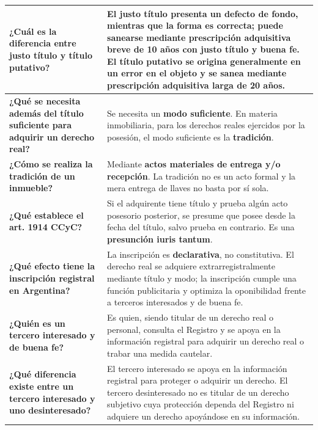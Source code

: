\documentclass[12pt,oneside]{book}
\begin{document}
\begin{longtable}{|>{\raggedright\arraybackslash}p{}|>{\raggedright\arraybackslash}p{}|}
\textbf{¿Cuál es la diferencia entre justo título y título putativo?} &
El \textbf{justo título} presenta un defecto de fondo, mientras que la forma es correcta; puede sanearse mediante prescripción adquisitiva breve de 10 años con justo título y buena fe. El \textbf{título putativo} se origina generalmente en un error en el objeto y se sanea mediante prescripción adquisitiva larga de 20 años. \\
\hline

\textbf{¿Qué se necesita además del título suficiente para adquirir un derecho real?} &
Se necesita un \textbf{modo suficiente}. En materia inmobiliaria, para los derechos reales ejercidos por la posesión, el modo suficiente es la \textbf{tradición}. \\
\hline

\textbf{¿Cómo se realiza la tradición de un inmueble?} &
Mediante \textbf{actos materiales de entrega y/o recepción}. La tradición no es un acto formal y la mera entrega de llaves no basta por sí sola. \\
\hline

\textbf{¿Qué establece el art. 1914 CCyC?} &
Si el adquirente tiene título y prueba algún acto posesorio posterior, se presume que posee desde la fecha del título, salvo prueba en contrario. Es una \textbf{presunción iuris tantum}. \\
\hline

\textbf{¿Qué efecto tiene la inscripción registral en Argentina?} &
La inscripción es \textbf{declarativa}, no constitutiva. El derecho real se adquiere extrarregistralmente mediante título y modo; la inscripción cumple una función publicitaria y optimiza la oponibilidad frente a terceros interesados y de buena fe. \\
\hline

\textbf{¿Quién es un tercero interesado y de buena fe?} &
Es quien, siendo titular de un derecho real o personal, consulta el Registro y se apoya en la información registral para adquirir un derecho real o trabar una medida cautelar. \\
\hline

\textbf{¿Qué diferencia existe entre un tercero interesado y uno desinteresado?} &
El tercero interesado se apoya en la información registral para proteger o adquirir un derecho. El tercero desinteresado no es titular de un derecho subjetivo cuya protección dependa del Registro ni adquiere un derecho apoyándose en su información. \\
\hline


\end{longtable}
\end{document}
